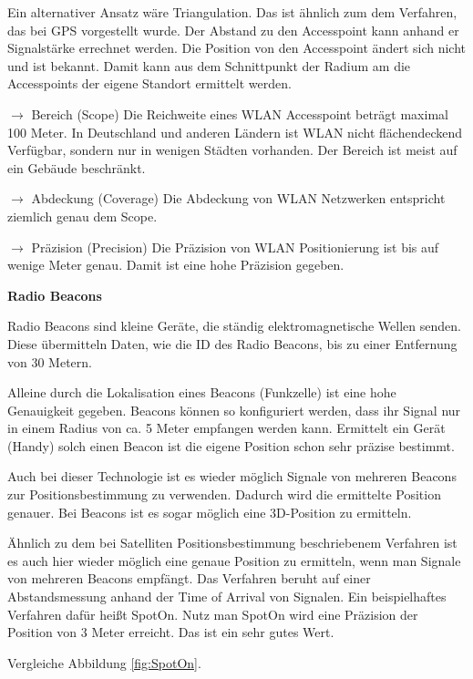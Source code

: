 Ein alternativer Ansatz wäre Triangulation. Das ist ähnlich zum dem Verfahren, das bei GPS vorgestellt wurde. Der Abstand zu den Accesspoint kann anhand er Signalstärke errechnet werden. Die Position von den Accesspoint ändert sich nicht und ist bekannt. Damit kann aus dem Schnittpunkt der Radium am die Accesspoints der eigene Standort ermittelt werden.

\cite[S. 209-211]{Schiller2004}

$\longrightarrow$ Bereich (Scope) Die Reichweite eines WLAN Accesspoint beträgt maximal 100 Meter. In Deutschland und anderen Ländern ist WLAN nicht flächendeckend Verfügbar, sondern nur in wenigen Städten vorhanden. Der Bereich ist meist auf ein Gebäude beschränkt.

$\longrightarrow$ Abdeckung (Coverage) Die Abdeckung von WLAN Netzwerken entspricht ziemlich genau dem Scope. 

$\longrightarrow$ Präzision (Precision) Die Präzision von WLAN Positionierung ist bis auf wenige Meter genau. Damit ist eine hohe Präzision gegeben.

\textbf{Radio Beacons}

Radio Beacons sind kleine Geräte, die ständig elektromagnetische Wellen senden. Diese übermitteln Daten, wie die ID des Radio Beacons, bis zu einer Entfernung von 30 Metern.

Alleine durch die Lokalisation eines Beacons (Funkzelle) ist eine hohe Genauigkeit gegeben. Beacons können so konfiguriert werden, dass ihr Signal nur in einem Radius von ca. 5 Meter empfangen werden kann. Ermittelt ein Gerät (Handy) solch einen Beacon ist die eigene Position schon sehr präzise bestimmt.

Auch bei dieser Technologie ist es wieder möglich Signale von mehreren Beacons zur Positionsbestimmung zu verwenden. Dadurch wird die ermittelte Position genauer. Bei Beacons ist es sogar möglich eine 3D-Position zu ermitteln.

Ähnlich zu dem bei Satelliten Positionsbestimmung beschriebenem Verfahren ist es auch hier wieder möglich eine genaue Position zu ermitteln, wenn man Signale von mehreren Beacons empfängt. Das Verfahren beruht auf einer Abstandsmessung anhand der Time of Arrival von Signalen. Ein beispielhaftes Verfahren dafür heißt SpotOn.
Nutz man SpotOn wird eine Präzision der Position von 3 Meter erreicht. Das ist ein sehr gutes Wert.

\cite[S. 201 - 204]{Schiller2004}

Vergleiche Abbildung \ref{fig:SpotOn}.

